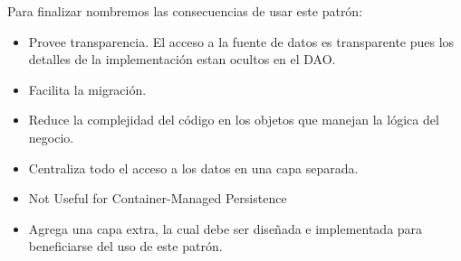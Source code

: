 Para finalizar nombremos las consecuencias de usar este patrón:
\begin{itemize}
\item Provee transparencia. El acceso a la fuente de datos es transparente pues los detalles de la implementación estan ocultos en el DAO. 


\item Facilita la migración.%

\item Reduce la complejidad del código en los objetos que manejan la lógica del negocio. %

\item Centraliza todo el acceso a los datos en una capa separada. %

\item 
Not Useful for Container-Managed Persistence


\item Agrega una capa extra, la cual debe ser diseñada e implementada para beneficiarse del uso de este patrón. %


\end{itemize}
